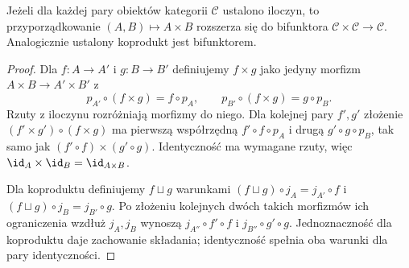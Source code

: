 \begin{stwierdzenie}\label{cat:prop:product-functor}
Jeżeli dla każdej pary obiektów kategorii $\mathcal C$ ustalono iloczyn, to przyporządkowanie $(A,B)\mapsto A\times B$ rozszerza się do bifunktora $\mathcal C\times\mathcal C\to\mathcal C$. Analogicznie ustalony koprodukt jest bifunktorem.
\end{stwierdzenie}
\begin{proof}
Dla $f:A\to A'$ i $g:B\to B'$ definiujemy $f\times g$ jako jedyny morfizm $A\times B\to A'\times B'$ z
\[
p_{A'}\circ(f\times g)=f\circ p_A,\qquad
p_{B'}\circ(f\times g)=g\circ p_B.
\]
Rzuty z iloczynu rozróżniają morfizmy do niego. Dla kolejnej pary $f',g'$ złożenie $(f'\times g')\circ(f\times g)$ ma pierwszą współrzędną $f'\circ f\circ p_A$ i drugą $g'\circ g\circ p_B$, tak samo jak $(f'\circ f)\times(g'\circ g)$. Identyczność ma wymagane rzuty, więc $\id_A\times\id_B=\id_{A\times B}$.

Dla koproduktu definiujemy $f\sqcup g$ warunkami $(f\sqcup g)\circ j_A=j_{A'}\circ f$ i $(f\sqcup g)\circ j_B=j_{B'}\circ g$. Po złożeniu kolejnych dwóch takich morfizmów ich ograniczenia wzdłuż $j_A,j_B$ wynoszą $j_{A''}\circ f'\circ f$ i $j_{B''}\circ g'\circ g$. Jednoznaczność dla koproduktu daje zachowanie składania; identyczność spełnia oba warunki dla pary identyczności.
\end{proof}

